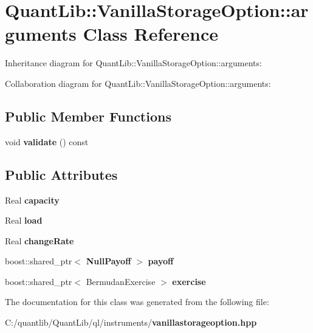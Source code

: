 \section{Quant\+Lib\+:\+:Vanilla\+Storage\+Option\+:\+:arguments Class Reference}
\label{class_quant_lib_1_1_vanilla_storage_option_1_1arguments}


Inheritance diagram for Quant\+Lib\+:\+:Vanilla\+Storage\+Option\+:\+:arguments\+:


Collaboration diagram for Quant\+Lib\+:\+:Vanilla\+Storage\+Option\+:\+:arguments\+:
\subsection*{Public Member Functions}
\begin{DoxyCompactItemize}
\item 
void {\bfseries validate} () const \label{class_quant_lib_1_1_vanilla_storage_option_1_1arguments_ae2b8fabf1b4b2a5c9dcbc80ae2472353}

\end{DoxyCompactItemize}
\subsection*{Public Attributes}
\begin{DoxyCompactItemize}
\item 
Real {\bfseries capacity}\label{class_quant_lib_1_1_vanilla_storage_option_1_1arguments_ad16f86ee81003393bf146d30d85db1d5}

\item 
Real {\bfseries load}\label{class_quant_lib_1_1_vanilla_storage_option_1_1arguments_ac69023003f928bb77479a96034fe6753}

\item 
Real {\bfseries change\+Rate}\label{class_quant_lib_1_1_vanilla_storage_option_1_1arguments_a9acbdf60b7fc9dbf6129f9db1d6e4c94}

\item 
boost\+::shared\+\_\+ptr$<$ {\bf Null\+Payoff} $>$ {\bfseries payoff}\label{class_quant_lib_1_1_vanilla_storage_option_1_1arguments_adc6b5d0a80295a2f63b3c0796bf0ea7d}

\item 
boost\+::shared\+\_\+ptr$<$ Bermudan\+Exercise $>$ {\bfseries exercise}\label{class_quant_lib_1_1_vanilla_storage_option_1_1arguments_ac71845a249135fe821c599323f5899ef}

\end{DoxyCompactItemize}


The documentation for this class was generated from the following file\+:\begin{DoxyCompactItemize}
\item 
C\+:/quantlib/\+Quant\+Lib/ql/instruments/{\bf vanillastorageoption.\+hpp}\end{DoxyCompactItemize}
